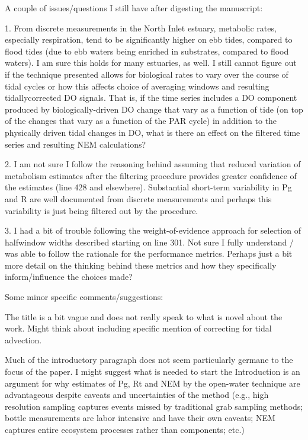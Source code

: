 \documentclass[letterpaper,12pt]{article}\usepackage[]{graphicx}\usepackage[]{color}
\begin{document}
A couple of issues/questions I still have after digesting the manuscript:

1. From discrete measurements in the North Inlet estuary, metabolic rates, especially respiration, tend to be significantly higher on ebb tides, compared to flood tides (due to ebb waters being enriched in substrates, compared to flood waters). I am sure this holds for many estuaries, as well. I still cannot figure out if the technique presented allows for biological rates to vary over the course of tidal cycles or how this affects choice of averaging windows and resulting tidallycorrected DO signals. That is, if the time series includes a DO component produced by biologically-driven DO change that vary as a function of tide (on top of the changes that vary as a function of the PAR cycle) in addition to the physically driven tidal changes in DO, what is there an effect on the filtered time series and resulting NEM calculations?

2. I am not sure I follow the reasoning behind assuming that reduced variation of metabolism estimates after the filtering procedure provides greater confidence of the estimates (line 428 and elsewhere). Substantial short-term variability in Pg and R are well documented from discrete measurements and perhaps this variability is just being filtered out by the procedure.

3. I had a bit of trouble following the weight-of-evidence approach for selection of halfwindow widths described starting on line 301. Not sure I fully understand / was able to follow the rationale for the performance metrics. Perhaps just a bit more detail on the thinking behind these metrics and how they specifically inform/influence the choices made?

Some minor specific comments/suggestions:

The title is a bit vague and does not really speak to what is novel about the work. Might think about including specific mention of correcting for tidal advection.

Much of the introductory paragraph does not seem particularly germane to the focus of the paper. I might suggest what is needed to start the Introduction is an argument for why estimates of Pg, Rt and NEM by the open-water technique are advantageous despite caveats and uncertainties of the method (e.g., high resolution sampling captures events missed by traditional grab sampling methods; bottle measurements are labor intensive and have their own caveats; NEM captures entire ecosystem processes rather than components; etc.)
\end{document}
